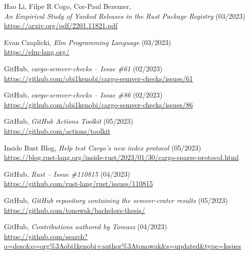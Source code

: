 \documentclass[licencjacka,en]{pracamgr}
\begin{document}
\begin{thebibliography}{99}
 Hao Li, Filpe R Cogo, Cor-Paul Bezemer, \\
    \textit{An Empirical Study of Yanked Releases in the Rust Package Registry} (03/2023) \\
	\url{https://arxiv.org/pdf/2201.11821.pdf}



 Evan Czaplicki,
    \textit{Elm Programming Language} (03/2023) \\
    \url{https://elm-lang.org/}



 GitHub,
	\textit{cargo-semver-checks -- Issue \#61} (02/2023) \\
	\url{https://github.com/obi1kenobi/cargo-semver-checks/issues/61}

 GitHub,
	\textit{cargo-semver-checks -- Issue \#86} (02/2023) \\
	\url{https://github.com/obi1kenobi/cargo-semver-checks/issues/86}



 GitHub,
	\textit{GitHub Actions Toolkit} (05/2023) \\
	\url{https://github.com/actions/toolkit}

 Inside Rust Blog,
\textit{Help test Cargo's new index protocol} (05/2023) \\
	\url{https://blog.rust-lang.org/inside-rust/2023/01/30/cargo-sparse-protocol.html}



 GitHub,
	\textit{Rust -- Issue \#110815} (04/2023) \\
	\url{https://github.com/rust-lang/rust/issues/110815}



 GitHub,
	\textit{GitHub repository containing the semver-crater results} (05/2023) \\
	\url{https://github.com/tonowak/bachelors-thesis/}



 GitHub,
	\textit{Contributions authored by Tomasz} (04/2023) \\
	\url{https://github.com/search?o=desc&q=org%3Aobi1kenobi+author%3Atonowak&s=updated&type=Issues}


\end{thebibliography}
\end{document}
